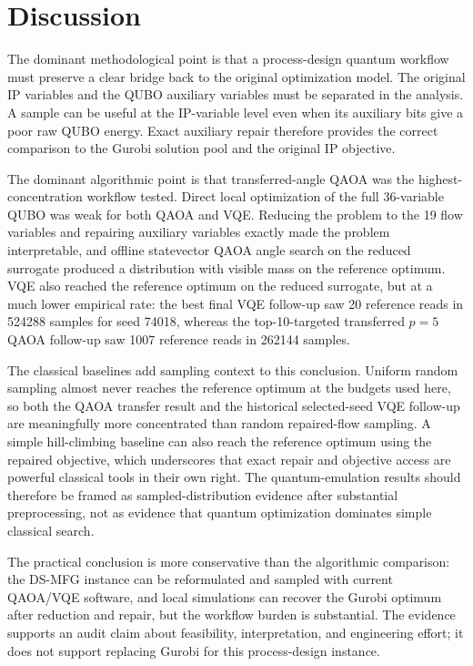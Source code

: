 \section{Discussion}
\label{sec:ds-mfg-discussion}

The dominant methodological point is that a process-design quantum workflow
must preserve a clear bridge back to the original optimization model. The
original IP variables and the QUBO auxiliary variables must be separated in the
analysis. A sample can be useful at the IP-variable level even when its
auxiliary bits give a poor raw QUBO energy. Exact auxiliary repair therefore
provides the correct comparison to the Gurobi solution pool and the original IP
objective.

The dominant algorithmic point is that transferred-angle QAOA was the highest-concentration
workflow tested. Direct local optimization of the full 36-variable QUBO was weak
for both QAOA and VQE. Reducing the problem to the 19 flow variables and
repairing auxiliary variables exactly made the problem interpretable, and
offline statevector QAOA angle search on the reduced surrogate produced a
distribution with visible mass on the reference optimum. VQE also reached the
reference optimum on the reduced surrogate, but at a much lower empirical rate:
the best final VQE follow-up saw 20 reference reads in 524288 samples for seed
74018, whereas the top-10-targeted transferred $p=5$ QAOA follow-up saw 1007
reference reads in 262144 samples.

The classical baselines add sampling context to this conclusion. Uniform random
sampling almost never reaches the reference optimum at the budgets used here, so
both the QAOA transfer result and the historical selected-seed VQE follow-up are meaningfully
more concentrated than random repaired-flow sampling. A simple hill-climbing
baseline can also reach the reference optimum using the repaired objective, which
underscores that exact repair and objective access are powerful classical tools
in their own right. The quantum-emulation results should therefore be framed as
sampled-distribution evidence after substantial preprocessing, not as evidence
that quantum optimization dominates simple classical search.

The practical conclusion is more conservative than the algorithmic comparison:
the DS-MFG instance can be reformulated and sampled with current QAOA/VQE
software, and local simulations can recover the Gurobi optimum after reduction
and repair, but the workflow burden is substantial. The evidence supports an
audit claim about feasibility, interpretation, and engineering effort; it does
not support replacing Gurobi for this process-design instance.

